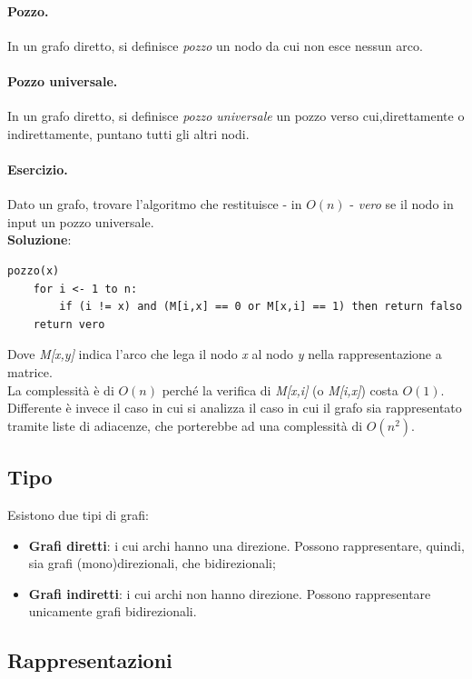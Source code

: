 \paragraph{Pozzo.}
In un grafo diretto, si definisce \textit{pozzo} un nodo da cui non esce nessun arco.
\paragraph{Pozzo universale.}
In un grafo diretto, si definisce \textit{pozzo universale} un pozzo verso cui,direttamente o indirettamente, puntano tutti gli altri nodi.
\paragraph{Esercizio.}
Dato un grafo, trovare l'algoritmo che restituisce - in $O(n)$ - \textit{vero} se il nodo in input un pozzo universale. \\
\textbf{Soluzione}:
\begin{lstlisting}
pozzo(x)
    for i <- 1 to n:
        if (i != x) and (M[i,x] == 0 or M[x,i] == 1) then return falso
    return vero
\end{lstlisting}
Dove \textit{M[x,y]} indica l'arco che lega il nodo \textit{x} al nodo \textit{y} nella rappresentazione a matrice. \\
La complessità è di $O(n)$ perché la verifica di \textit{M[x,i]} (o \textit{M[i,x]}) costa $O(1)$. Differente è invece il caso in cui si analizza il caso in cui il grafo sia rappresentato tramite liste di adiacenze, che porterebbe ad una complessità di $O(n^2)$.

\subsection{Tipo}
Esistono due tipi di grafi:
\begin{itemize}
    \item \textbf{Grafi diretti}: i cui archi hanno una direzione. Possono rappresentare, quindi, sia grafi (mono)direzionali, che bidirezionali;
    \item \textbf{Grafi indiretti}: i cui archi non hanno direzione. Possono rappresentare unicamente grafi bidirezionali.
\end{itemize}

\newpage

\subsection{Rappresentazioni}
